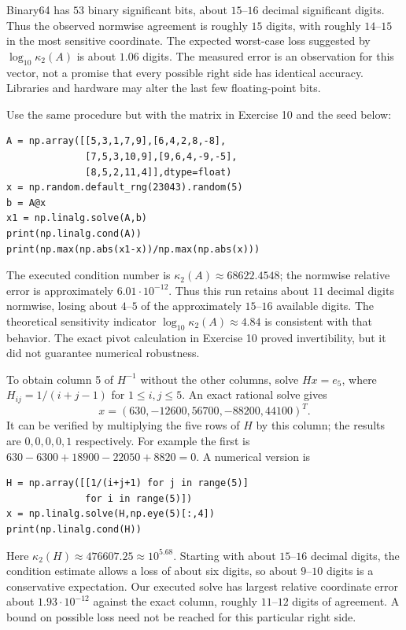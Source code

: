 Binary64 has $53$ binary significant bits, about $15$--$16$ decimal
significant digits. Thus the observed normwise agreement is roughly
$15$ digits, with roughly $14$--$15$ in the most sensitive coordinate.
The expected worst-case loss suggested by $\log_{10}\kappa_2(A)$ is about
$1.06$ digits. The measured error is an observation for this vector,
not a promise that every possible right side has identical accuracy.
Libraries and hardware may alter the last few floating-point bits.

Use the same procedure but with the matrix in Exercise 10 and the seed below:
\begin{verbatim}
A = np.array([[5,3,1,7,9],[6,4,2,8,-8],
              [7,5,3,10,9],[9,6,4,-9,-5],
              [8,5,2,11,4]],dtype=float)
x = np.random.default_rng(23043).random(5)
b = A@x
x1 = np.linalg.solve(A,b)
print(np.linalg.cond(A))
print(np.max(np.abs(x1-x))/np.max(np.abs(x)))
\end{verbatim}
The executed condition number is $\kappa_2(A)\approx68622.4548$;
the normwise relative error is approximately $6.01\cdot10^{-12}$.
Thus this run retains about $11$ decimal digits normwise, losing about
$4$--$5$ of the approximately $15$--$16$ available digits.
The theoretical sensitivity indicator $\log_{10}\kappa_2(A)\approx4.84$
is consistent with that behavior. The exact pivot calculation in Exercise 10
proved invertibility, but it did not guarantee numerical robustness.

To obtain column 5 of $H^{-1}$ without the other columns, solve
$Hx=e_5$, where $H_{ij}=1/(i+j-1)$ for $1\le i,j\le5$.
An exact rational solve gives
\[
 \boxed{x=(630,-12600,56700,-88200,44100)^T}.
\]
It can be verified by multiplying the five rows of $H$ by this column;
the results are $0,0,0,0,1$ respectively. For example the first is
$630-6300+18900-22050+8820=0$.
A numerical version is
\begin{verbatim}
H = np.array([[1/(i+j+1) for j in range(5)]
              for i in range(5)])
x = np.linalg.solve(H,np.eye(5)[:,4])
print(np.linalg.cond(H))
\end{verbatim}
Here $\kappa_2(H)\approx476607.25\approx10^{5.68}$.
Starting with about $15$--$16$ decimal digits, the condition estimate
allows a loss of about six digits, so about $9$--$10$ digits is a
conservative expectation. Our executed solve has largest relative
coordinate error about $1.93\cdot10^{-12}$ against the exact column,
roughly $11$--$12$ digits of agreement. A bound on possible loss need
not be reached for this particular right side.

